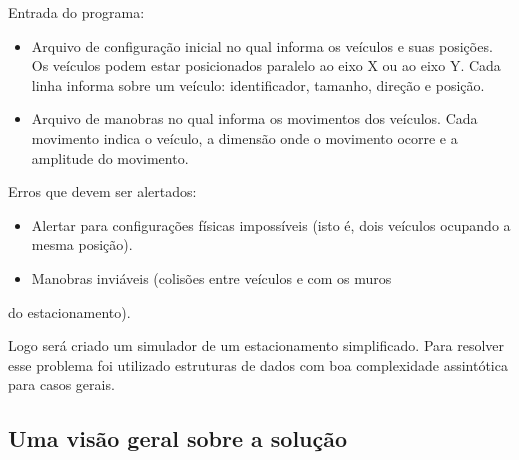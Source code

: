 \documentclass[11pt]{article}
\begin{document}
Entrada do programa:
\begin{itemize}
\item Arquivo de configuração inicial no qual informa os veículos e suas posições. Os veículos podem estar posicionados paralelo ao eixo X ou ao eixo Y. Cada linha informa sobre um veículo: identificador, tamanho, direção e posição.
\item Arquivo de manobras no qual informa os movimentos dos veículos. Cada movimento indica o veículo, a dimensão onde o movimento ocorre e a amplitude do movimento.
\end{itemize}

Erros que devem ser alertados:
\begin{itemize}
\item Alertar para configurações físicas impossíveis (isto é, dois veículos ocupando a mesma posição).
\item Manobras inviáveis (colisões entre veículos e com os muros
\end{itemize}
do estacionamento).

Logo será criado um simulador de um estacionamento simplificado. Para resolver esse problema foi utilizado estruturas de dados com boa complexidade assintótica para casos gerais.

\subsection{Uma visão geral sobre a solução}
\label{sec:org210e665}
\end{document}

